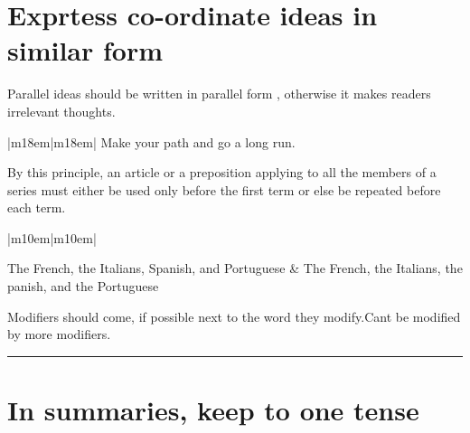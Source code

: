 \documentclass[10pt]{report}
\begin{document}
\section {\bfseries Exprtess co-ordinate ideas in similar form} \label {sec:seven}


Parallel ideas should be written in parallel form , otherwise it makes readers
irrelevant thoughts.





\begin{table}[!tbh]
    \centering
        \begin{tabular}{|m{18em}|m{18em}|}
        \hline
	Make your path and go a long run.\\
\hline


       
        

 \end{tabular}
 \end{table}
 



By this principle, an article or a preposition applying to all the members of a series
must either be used only before the first term or else be repeated before each term.


\begin{table}[!tbh]
    \centering
        \begin{tabular}{|m{10em}|m{10em}|}
        \hline

		The French, the Italians, Spanish,
and Portuguese &
The French, the Italians, the
panish, and the Portuguese\\
\hline


       
        

 \end{tabular}
 \end{table}
 







       
 
 
 Modifiers should come, if possible next to the word they modify.Cant be modified by more modifiers.\\

\noindent\rule[0.5ex]{\linewidth}{2pt} %


\newpage

 \section {\bfseries  In summaries, keep to one tense}
 
\end{document}
